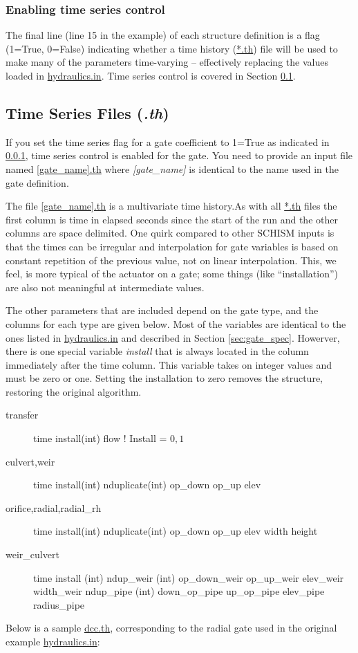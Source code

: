 \subsubsection{Enabling time series control}
\label{sec:timeflag}
The final line (line 15 in the example) of each structure definition is a flag (1=True, 0=False) indicating whether a time history (\url{*.th}) file will be used to make many of the parameters time-varying -- effectively replacing the values loaded in 
\url{hydraulics.in}. Time series control is covered in Section \ref{sec:timeseries}.

\subsection{Time Series Files ({\em *.th})}
\label{sec:timeseries}
If you set the time series flag for a gate coefficient to 1=True as indicated in \ref{sec:timeflag}, time series control is
enabled for the gate. You need to provide an input file named \url{[gate_name].th} where {\em [gate\_name]} 
is identical to the name used in the gate definition.

The file \url{[gate_name].th} is a multivariate time history.As with all \url{*.th} files the first column  is time in elapsed seconds since the start of the run and the other columns are space delimited.
One quirk compared to other SCHISM inputs is that the times can be irregular and interpolation 
for gate variables is based on constant repetition of the previous value, not on linear interpolation. This, we feel, is more typical of the actuator on a gate; some things (like "`installation"') are
also not meaningful at intermediate values.

The other parameters that are included depend on the gate type, and the columns for each type are given below. 
Most of the variables are identical to the ones listed in \url{hydraulics.in} and described in
Section \ref{sec:gate_spec}. Howerver, there is one special variable {\em install} that is always 
located in the column immediately after the time column. This variable takes on integer values and must be zero or one. 
Setting the installation to zero removes the structure, restoring the original algorithm.
 
\begin{description}
\item[transfer] time  install(int) flow    ! Install = \(0,1\)
\item[culvert,weir] time install(int) nduplicate(int) op\_down op\_up elev 
\item[orifice,radial,radial\_rh] time install(int) nduplicate(int) op\_down op\_up elev width height
\item[weir\_culvert] time install (int) ndup\_weir (int) op\_down\_weir op\_up\_weir elev\_weir width\_weir ndup\_pipe (int) down\_op\_pipe up\_op\_pipe elev\_pipe radius\_pipe
\end{description}

Below is a sample \url{dcc.th}, corresponding to the radial gate used in the original example \url{hydraulics.in}:
\begin{samepage}

\end{samepage}


